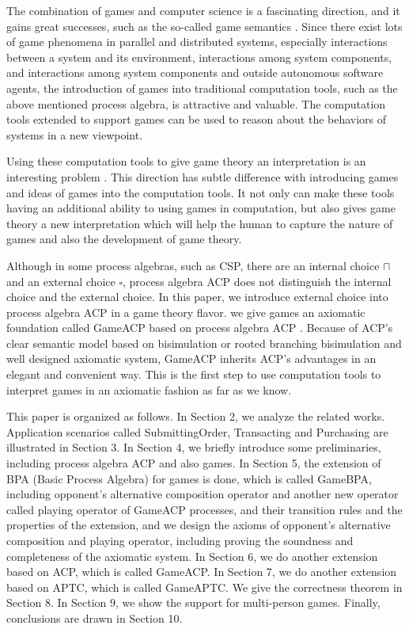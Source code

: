 \documentclass{fac}
\begin{document}
The combination of games and computer science is a fascinating direction, and it gains great successes, such as the so-called game semantics \cite{PCF3}. Since there exist lots of game phenomena in parallel and distributed systems, especially interactions between a system and its environment, interactions among system components, and interactions among system components and outside autonomous software agents, the introduction of games into traditional computation tools, such as the above mentioned process algebra, is attractive and valuable. The  computation tools extended to support games can be used to reason about the behaviors of systems in a new viewpoint.

Using these computation tools to give game theory an interpretation is an interesting problem \cite{GameProcess}. This direction has subtle difference with introducing games and ideas of games into the computation tools. It not only can make these tools having an additional ability to using games in computation, but also gives game theory a new interpretation which will help the human to capture the nature of games and also the development of game theory.

Although in some process algebras, such as CSP, there are an internal choice $\sqcap$ and an external choice $\square$, process algebra ACP does not distinguish the internal choice and the external choice. In this paper, we introduce external choice into process algebra ACP in a game theory flavor. we give games an axiomatic foundation called GameACP based on process algebra ACP \cite{ACP}. Because of ACP's clear semantic model based on bisimulation or rooted branching bisimulation \cite{SOS} and well designed axiomatic system, GameACP inherits ACP's advantages in an elegant and convenient way. This is the first step to use computation tools to interpret games in an axiomatic fashion as far as we know.

This paper is organized as follows. In Section 2, we analyze the related works. Application scenarios called SubmittingOrder, Transacting and Purchasing are illustrated in Section 3. In Section 4, we briefly introduce some preliminaries, including process algebra ACP and also games. In Section 5, the extension of BPA (Basic Process Algebra) for games is done, which is called GameBPA, including opponent's alternative composition operator and another new operator called playing operator of GameACP processes, and their transition rules and the properties of the extension, and we design the axioms of opponent's alternative composition and playing operator, including proving the soundness and completeness of the axiomatic system. In Section 6, we do another extension based on ACP, which is called GameACP. In Section 7, we do another extension based on APTC, which is called GameAPTC. We give the correctness theorem in Section 8. In Section 9, we show the support for multi-person games. Finally, conclusions are drawn in Section 10.
\end{document}
